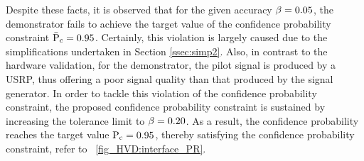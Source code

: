%
%		
%

Despite these facts, it is observed that for the given accuracy $\beta = 0.05$, the demonstrator fails to achieve the target value of the confidence probability constraint $\bar{\text{P}}_{\text{c}} = 0.95$. Certainly, this violation is largely caused due to the simplifications undertaken in Section \ref{ssec:simp2}. 
Also, in contrast to the hardware validation, for the demonstrator, the pilot signal is produced by a USRP, thus offering a poor signal quality than that produced by the signal generator. 
In order to tackle this violation of the confidence probability constraint, the proposed confidence probability constraint is sustained by increasing the tolerance limit to $\beta = 0.20$. 
As a result, the confidence probability reaches the target value $\text{P}_{\text{c}} = 0.95$, thereby satisfying the confidence probability constraint, refer to \figurename~\ref{fig_HVD:interface_PR}. 

